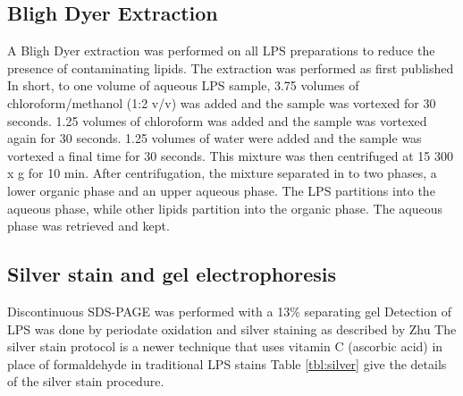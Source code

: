 	\subsection{Bligh Dyer Extraction} %
	\label{sub:bligh_dyer_extraction}
  A Bligh Dyer extraction was performed on all \ac{LPS} preparations to reduce the presence of
  contaminating lipids. The extraction was performed as first published In
  short, to one volume of aqueous \ac{LPS} sample, 3.75 volumes of chloroform/methanol (1:2 v/v) was
  added and the sample was vortexed for 30 seconds. 1.25 volumes of chloroform was added and the
  sample was vortexed again for 30 seconds. 1.25 volumes of water were added and the sample was
  vortexed a final time for 30 seconds. This mixture was then centrifuged at 15 300 x g for 10
  min. After centrifugation, the mixture separated in to two phases, a lower organic phase and an
  upper aqueous phase. The \ac{LPS} partitions into the aqueous phase, while other lipids partition
  into the organic phase. The aqueous phase was retrieved and kept.

	\subsection{Silver stain and gel electrophoresis} %
	\label{sub:gel_electrophoresis}

  Discontinuous \ac{SDS-PAGE} was performed with a 13\% separating gel Detection
  of \ac{LPS} was done by periodate oxidation and silver staining as described by Zhu
  \etal\! The silver stain protocol is a newer technique that uses
  vitamin C (ascorbic acid) in place of formaldehyde in traditional \ac{LPS}
  stains Table \ref{tbl:silver} give the details of the silver stain
  procedure.

